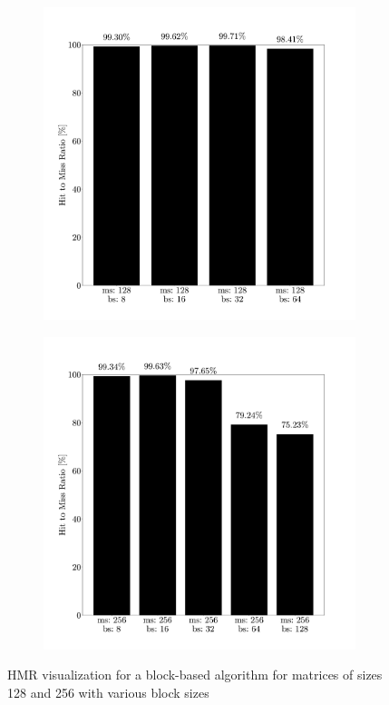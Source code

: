\begin{figure}[!htbp]
    \centering
    \begin{subfigure}{0.5\textwidth}
      \centering
      \includegraphics[width=1\linewidth]{figures/05-analysis/block_ms128.pdf}
    \end{subfigure}%
    \begin{subfigure}{0.5\textwidth}
      \centering
      \includegraphics[width=1\linewidth]{figures/05-analysis/block_ms256.pdf}
    \end{subfigure}
    \caption{HMR visualization for a block-based algorithm for matrices of sizes 128 and 256 with various block sizes}
\end{figure}

